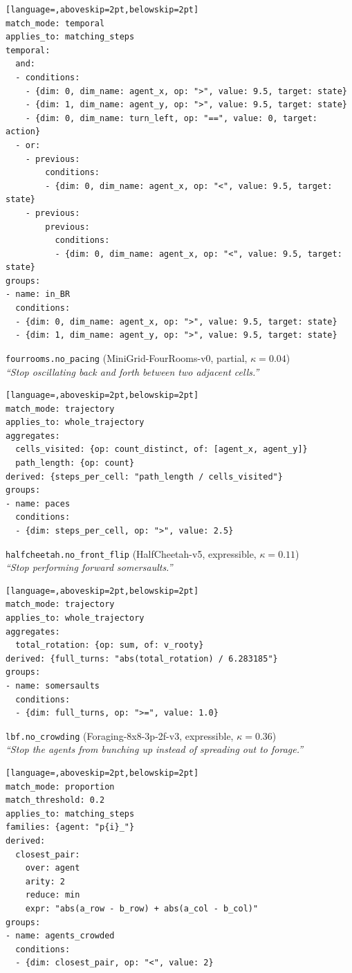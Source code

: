 \begin{lstlisting}[language=,aboveskip=2pt,belowskip=2pt]
match_mode: temporal
applies_to: matching_steps
temporal:
  and:
  - conditions:
    - {dim: 0, dim_name: agent_x, op: ">", value: 9.5, target: state}
    - {dim: 1, dim_name: agent_y, op: ">", value: 9.5, target: state}
    - {dim: 0, dim_name: turn_left, op: "==", value: 0, target: action}
  - or:
    - previous:
        conditions:
        - {dim: 0, dim_name: agent_x, op: "<", value: 9.5, target: state}
    - previous:
        previous:
          conditions:
          - {dim: 0, dim_name: agent_x, op: "<", value: 9.5, target: state}
groups:
- name: in_BR
  conditions:
  - {dim: 0, dim_name: agent_x, op: ">", value: 9.5, target: state}
  - {dim: 1, dim_name: agent_y, op: ">", value: 9.5, target: state}
\end{lstlisting}
\par\medskip\noindent\texttt{fourrooms.no\_pacing} (MiniGrid-FourRooms-v0, partial, $\kappa=0.04$)\\
\textit{``Stop oscillating back and forth between two adjacent cells.''}\nopagebreak
\begin{lstlisting}[language=,aboveskip=2pt,belowskip=2pt]
match_mode: trajectory
applies_to: whole_trajectory
aggregates:
  cells_visited: {op: count_distinct, of: [agent_x, agent_y]}
  path_length: {op: count}
derived: {steps_per_cell: "path_length / cells_visited"}
groups:
- name: paces
  conditions:
  - {dim: steps_per_cell, op: ">", value: 2.5}
\end{lstlisting}
\par\medskip\noindent\texttt{halfcheetah.no\_front\_flip} (HalfCheetah-v5, expressible, $\kappa=0.11$)\\
\textit{``Stop performing forward somersaults.''}\nopagebreak
\begin{lstlisting}[language=,aboveskip=2pt,belowskip=2pt]
match_mode: trajectory
applies_to: whole_trajectory
aggregates:
  total_rotation: {op: sum, of: v_rooty}
derived: {full_turns: "abs(total_rotation) / 6.283185"}
groups:
- name: somersaults
  conditions:
  - {dim: full_turns, op: ">=", value: 1.0}
\end{lstlisting}
\par\medskip\noindent\texttt{lbf.no\_crowding} (Foraging-8x8-3p-2f-v3, expressible, $\kappa=0.36$)\\
\textit{``Stop the agents from bunching up instead of spreading out to forage.''}\nopagebreak
\begin{lstlisting}[language=,aboveskip=2pt,belowskip=2pt]
match_mode: proportion
match_threshold: 0.2
applies_to: matching_steps
families: {agent: "p{i}_"}
derived:
  closest_pair:
    over: agent
    arity: 2
    reduce: min
    expr: "abs(a_row - b_row) + abs(a_col - b_col)"
groups:
- name: agents_crowded
  conditions:
  - {dim: closest_pair, op: "<", value: 2}
\end{lstlisting}
